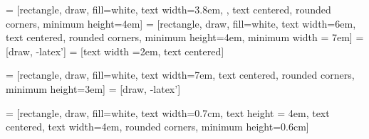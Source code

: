 \usetikzlibrary {shapes,positioning}
 = [rectangle, draw, fill=white, text width=3.8em,
, text
centered, rounded corners, minimum height=4em]
 =
[rectangle, draw, fill=white, text width=6em, text centered, rounded
corners, minimum height=4em, minimum width = 7em]  = [draw, -latex']
 = [text width =2em, text centered]

 =
[rectangle, draw, fill=white, text width=7em, text centered, rounded
corners, minimum height=3em]  = [draw, -latex']



 = [rectangle, draw, fill=white, text width=0.7cm, text height = 4em, text
centered,  text width=4em, rounded corners, minimum height=0.6cm]



